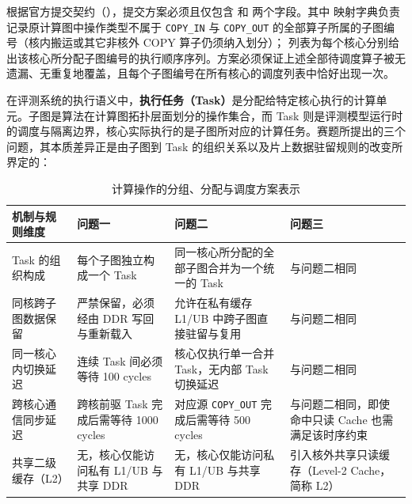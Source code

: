 \documentclass[anonymous,notoc]{gmcm2026}
\begin{document}
根据官方提交契约（\texttt{}），提交方案必须且仅包含 \texttt{} 和 \texttt{} 两个字段。其中 \texttt{} 映射字典负责记录原计算图中操作类型不属于 \texttt{COPY\_IN} 与 \texttt{COPY\_OUT} 的全部算子所属的子图编号（核内搬运或其它非核外 COPY 算子仍须纳入划分）；\texttt{} 列表为每个核心分别给出该核心所分配子图编号的执行顺序序列。方案必须保证上述全部待调度算子被无遗漏、无重复地覆盖，且每个子图编号在所有核心的调度列表中恰好出现一次。

在评测系统的执行语义中，\textbf{执行任务（Task）}是分配给特定核心执行的计算单元。子图是算法在计算图拓扑层面划分的操作集合，而 Task 则是评测模型运行时的调度与隔离边界，核心实际执行的是子图所对应的计算任务。赛题所提出的三个问题，其本质差异正是由子图到 Task 的组织关系以及片上数据驻留规则的改变所界定的：

{\def\LTcaptype{table} %
\begin{table}[!htbp]\centering
\caption{计算操作的分组、分配与调度方案表示}\label{tab:01-problem-1}\small
\begin{tabular}{@{}
  >{\raggedright\arraybackslash}p{}
  >{\raggedright\arraybackslash}p{}
  >{\raggedright\arraybackslash}p{}
  >{\raggedright\arraybackslash}p{}@{}}
\toprule\noalign{}
\begin{minipage}[b]{\linewidth}\raggedright
机制与规则维度
\end{minipage} & \begin{minipage}[b]{\linewidth}\raggedright
问题一
\end{minipage} & \begin{minipage}[b]{\linewidth}\raggedright
问题二
\end{minipage} & \begin{minipage}[b]{\linewidth}\raggedright
问题三
\end{minipage} \\
\midrule\noalign{}


Task 的组织构成 & 每个子图独立构成一个 Task & 同一核心所分配的全部子图合并为一个统一的 Task & 与问题二相同 \\
同核跨子图数据保留 & 严禁保留，必须经由 DDR 写回与重新载入 & 允许在私有缓存 L1/UB 中跨子图直接驻留与复用 & 与问题二相同 \\
同一核心内切换延迟 & 连续 Task 间必须等待 100 cycles & 核心仅执行单一合并 Task，无内部 Task 切换延迟 & 与问题二相同 \\
跨核心通信同步延迟 & 跨核前驱 Task 完成后需等待 1000 cycles & 对应源 \texttt{COPY\_OUT} 完成后需等待 500 cycles & 与问题二相同，即使命中只读 Cache 也需满足该时序约束 \\
共享二级缓存（L2） & 无，核心仅能访问私有 L1/UB 与共享 DDR & 无，核心仅能访问私有 L1/UB 与共享 DDR & 引入核外共享只读缓存（Level-2 Cache，简称 L2） \\
\bottomrule\end{tabular}
\end{table}
}
\end{document}
